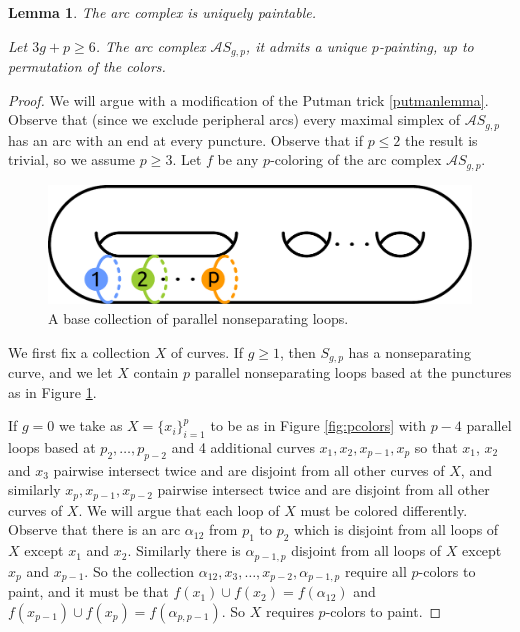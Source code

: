 \documentclass[11pt]{article}
\newtheorem{lemma}[theorem]{Lemma}
\theoremstyle{remark}
\theoremstyle{definition}
\begin{document}
\begin{lemma}
  The arc complex is uniquely paintable.

  Let $3g+p\geq6$.
  The arc complex $\mathcal A S_{g,p}$,
  it admits a
  unique
  $p$-painting,
  up to permutation of the colors.
  \label{lemma:paint}
\end{lemma}

\begin{proof}
  We will argue with a modification of the Putman trick \ref{putmanlemma}.
  Observe that (since we exclude peripheral arcs)
  every maximal simplex of $\mathcal A S_{g,p}$
  has an arc with an end at every puncture.
  Observe that if $p \leq 2$ the result is trivial,
  so we assume $p \geq 3$.
  Let $f$ be any $p$-coloring of the
  arc complex $\mathcal A S_{g,p}$.

  \begin{figure}
    \includegraphics[width=.6\textwidth]{figures/pcolorgenus.pdf}
    \caption{A base collection of parallel nonseparating loops.}
    \label{fig:pcolorg}
  \end{figure}

  We first fix a collection $X$ of curves.
  If $g\geq1$, then $S_{g,p}$ has a nonseparating curve,
  and we let $X$ contain $p$ parallel nonseparating loops based at the punctures
  as in Figure \ref{fig:pcolorg}.


  If $g=0$ we take as $X=\{x_i\}_{i=1}^p$ to be as in Figure \ref{fig:pcolors}
  with $p-4$ parallel loops based at $p_2,\ldots,p_{p-2}$
  and 4 additional curves $x_1,x_2,x_{p-1},x_p$
  so that $x_1$, $x_2$ and $x_3$ pairwise intersect twice
  and are disjoint from all other curves of $X$,
  and similarly $x_p,x_{p-1},x_{p-2}$ pairwise intersect twice
  and are disjoint from all other curves of $X$.
  We will argue that each loop of $X$ must be colored differently.
  Observe that there is an arc
  $\alpha_{12}$
  from $p_1$ to $p_2$
  which is disjoint from all loops of $X$ except $x_1$ and $x_2$.
  Similarly
  there is  $\alpha_{p-1,p}$
  disjoint from all loops of $X$ except $x_p$ and $x_{p-1}$.
  So the collection $\alpha_{12},x_3,\ldots,x_{p-2},\alpha_{p-1,p}$
  require all $p$-colors to paint,
  and it must be that $f(x_1)\cup f(x_2) = f(\alpha_{12})$
  and $f(x_{p-1})\cup f(x_p) = f(\alpha_{p,p-1})$.
  So $X$ requires $p$-colors to paint.


\end{proof}
\end{document}
